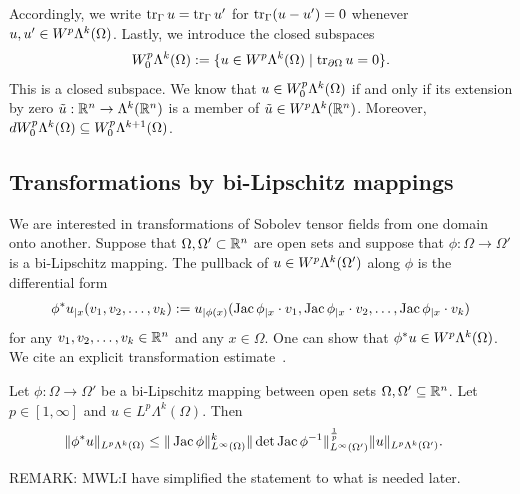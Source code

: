 \documentclass[10pt,a4paper]{article}
\newcommand{\todo}[1]{{\colorbox{yellow}{#1}}}
\newcommand\cye[1]{%
\protect\leavevmode
\begingroup
    \color{blue}%
    #1%
\endgroup
}
\newcommand{\mwl}[1]{{\color{red}#1}}
\newcommand{\notice}[1]{{\color{red}REMARK: #1}}
\begin{document}
Accordingly, we write $\operatorname{tr}_{\Gamma} u = \operatorname{tr}_{\Gamma} u'$ for $\operatorname{tr}_{\Gamma} (u-u') = 0$ whenever $u, u' \in W^{p}\Lambda^{k}(\Omega)$.
Lastly, we introduce the closed subspaces 
\begin{gather*}
    W^{p}_{0}\Alt^{k}(\Omega) 
    := 
    \{ u \in W^{p}\Alt^{k}(\Omega) \suchthat \trace_{\partial \Omega} u = 0 \}
    .
\end{gather*}
\mwl{This is a closed subspace. We know that $u \in W^{p}_{0}\Lambda^{k}(\Omega)$ if and only if its extension by zero $\tilde u : {\mathbb R}^{n} \rightarrow \Lambda^{k}({\mathbb R}^{n})$ is a member of $\tilde u \in W^{p}\Lambda^{k}({\mathbb R}^{n})$. Moreover, $d W^{p}_{0}\Lambda^{k}(\Omega) \subseteq W^{p}_{0}\Lambda^{k+1}(\Omega)$.}


\subsection{Transformations by bi-Lipschitz mappings}

We are interested in transformations of Sobolev tensor fields from one domain onto another. 
Suppose that $\Omega,\Omega' \subset {\mathbb R}^{n}$ are open sets and suppose that $\phi: \Omega \to \Omega'$ is a bi-Lipschitz mapping.
The pullback of $u \in W^{p}\Lambda^{k}(\Omega')$ along $\phi$ is the differential form 
\begin{align} \label{equation:pullback}
    \phi^{\ast}u_{|x}( v_{1}, v_{2}, \ldots, v_{k} ) 
    := 
    u_{|\phi(x)}( \operatorname{{\rm Jac}}\phi_{|x} \cdot v_1, \operatorname{{\rm Jac}}\phi_{|x} \cdot v_2, \ldots, \operatorname{{\rm Jac}}\phi_{|x} \cdot v_k ) 
\end{align}
for any $v_1, v_2, \dots, v_k \in {\mathbb R}^{n}$ and any $x \in \Omega$. One can show that $\phi^{\ast}u \in W^{p}\Lambda^{k}(\Omega)$.
We cite an explicit transformation estimate~\cite{licht2019smoothed}.

\begin{proposition} \label{proposition:pullbackestimate}
 Let $\phi : \Omega \rightarrow \Omega'$ be a bi-Lipschitz mapping between open sets $\Omega, \Omega' \subseteq {\mathbb R}^{n}$.
 Let $p \in [1,\infty]$ and $u \in L^{p}\Lambda^{k}(\Omega)$. 
 Then 
 \begin{align}\label{math:pullbackestimate}
  \begin{split}
  \| \phi^{\ast} u \|_{L^{p}\Lambda^{k}(\Omega)}
  &\leq 
  \| \operatorname{{\rm Jac}} \phi \|^{k}_{L^{\infty}(\Omega)}
  \| \det\operatorname{{\rm Jac}} \phi^{-1} \|^{\frac{1}{p}}_{L^{\infty}(\Omega')}
  \| u \|_{L^{p}\Lambda^{k}(\Omega')}
  .
  \end{split}
 \end{align}
\end{proposition}
\notice{MWL:I have simplified the statement to what is needed later.}
\end{document}
